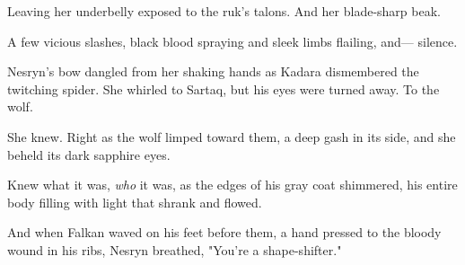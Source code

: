 Leaving her underbelly exposed to the ruk's talons.
And her blade-sharp beak.

A few vicious slashes, black blood spraying and sleek limbs flailing, and--- silence.

Nesryn's bow dangled from her shaking hands as Kadara dismembered the twitching spider.
She whirled to Sartaq, but his eyes were turned away.
To the wolf.

She knew.
Right as the wolf limped toward them, a deep gash in its side, and she beheld its dark sapphire eyes.

Knew what it was, \emph{who} it was, as the edges of his gray coat shimmered, his entire body filling with light that shrank and flowed.

And when Falkan waved on his feet before them, a hand pressed to the bloody wound in his ribs, Nesryn breathed, "You're a shape-shifter."

